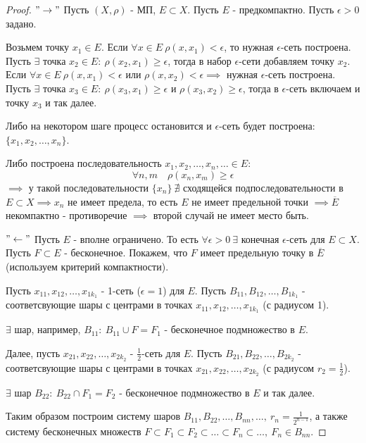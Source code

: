 \documentclass{report}
\theoremstyle{definition}
\begin{document}
\begin{proof}
  $"\rightarrow"$ Пусть $(X,\rho)$ - МП, $E \subset X$. Пусть $E$ - предкомпактно. Пусть $\epsilon > 0$ задано.

  Возьмем точку
  $x_1 \in E$. Если $\forall x \in E \ \rho(x,x_1) < \epsilon$, то нужная $\epsilon$-сеть построена. Пусть
  $\exists$ точка $x_2 \in E: \ \rho(x_2,x_1) \geqslant \epsilon$, тогда в набор $\epsilon$-сети добавляем
  точку $x_2$. Если $\forall x \in E \ \rho(x,x_1) < \epsilon$ или $\rho(x,x_2) < \epsilon \implies$ нужная
  $\epsilon$-сеть построена. Пусть $\exists$ точка $x_3 \in E: \ \rho(x_3,x_1) \geqslant \epsilon$ и $\rho(x_3,x_2)
    \geqslant \epsilon$, тогда в $\epsilon$-сеть включаем и точку $x_3$ и так далее.

  Либо на некотором шаге процесс
  остановится и $\epsilon$-сеть будет построена: $\{x_1,x_2,\ldots,x_n\}$.

  Либо построена последовательность
  $x_1,x_2,\ldots,x_n,\ldots \in E:$
  \begin{equation*}
    \forall n,m \quad \rho(x_n,x_m)\geqslant \epsilon
  \end{equation*} $\implies$ у такой
  последовательности $\{x_n\} \ \nexists$ сходящейся подпоследовательности в $E \subset X \implies x_n$
  не имеет предела, то есть $E$ не имеет предельной точки $\implies \overline{E}$ некомпактно - противоречие
  $\implies$ второй случай не имеет место быть.

  $"\leftarrow"$ Пусть $E$ - вполне ограничено. То есть $\forall \epsilon > 0 \ \exists$ конечная $\epsilon$-сеть
  для $E \subset X$. Пусть $F\subset E$ - бесконечное. Покажем, что $F$ имеет предельную точку в $\overline{E}$
  (используем критерий компактности).

  Пусть $x_{11},x_{12},\ldots,x_{1k_1}$ - 1-сеть ($\epsilon = 1$) для $E$. Пусть $B_{11},B_{12},\ldots,B_{1k_1}$
  - соответсвующие шары с центрами в точках $x_{11},x_{12},\ldots,x_{1k_1}$ (с радиусом 1).

  $\exists$ шар, например, $B_{11}: \ B_{11} \cup F = F_1$ - бесконечное подмножество в $E$.

  Далее, пусть
  $x_{21},x_{22},\ldots,x_{2k_2}$ - $\frac{1}{2}$-сеть для $E$. Пусть $B_{21},B_{22},\ldots,B_{2k_2}$ -
  соответсвующие шары с центрами в точках $x_{21},x_{22},\ldots,x_{2k_2}$ (с радиусом $r_2 = \frac{1}{2}$).

  $\exists$ шар $B_{22}: \ B_{22} \cap F_1 = F_2$ - бесконечное подмножество в $E$ и так далее.

  Таким образом построим систему шаров $B_{11}, B_{22}, \ldots, B_{nn}, \ldots, \ r_n = \frac{1}{2^{n-1}}$,
  а также систему бесконечных множеств $F\subset F_1\subset F_2\subset \ldots\subset F_n\subset \ldots, \ F_n \in B_{nn}$.


\end{proof}
\end{document}
